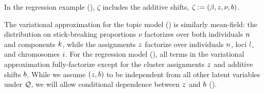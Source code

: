 
\hrulefill

In the regression example (), $\zeta$ includes
the additive shifts, $\zeta := (\beta, z, \nu, b)$.

The variational approximation for the topic model
() is similarly mean-field: the distribution on
stick-breaking proportions $\nu$ factorizes over both individuals $n$ and
components $k$, while the assignments $z$ factorize over individuals $n$,
loci $l$, and chromosomes $i$. For the regression model
(), all terms in the variational approximation
fully-factorize except for the cluster assignments $z$ and additive shifts
$b$. While we assume $(z, b)$ to be independent from all other latent
variables under $\mathcal{Q}$, we will allow conditional dependence between $z$ and $b$
().
